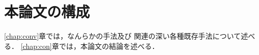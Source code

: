 \section{本論文の構成}
\ref{chap:conv}章では，なんらかの手法\cite{Kitamura2016taslp}及び
関連の深い各種既存手法\cite{Kitamura2016IWAENC}について述べる．
\ref{chap:con}章では，本論文の結論を述べる．
